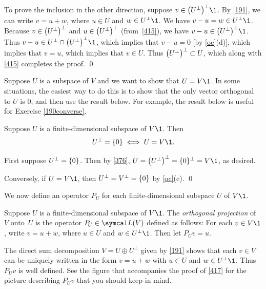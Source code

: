 To prove the inclusion in the other direction, suppose $v \in \paren[\big]{U^\perp}^\perp\1$.  By \ref{191}, we can write $v = u + w$, where
$u \in U$ and $w \in U^\perp\1$.  We have $v - u = w \in U^\perp\1$.  Because
$v \in \paren[\big]{U^\perp}^\perp$ and $u \in \paren[\big]{U^\perp}^\perp$
(from~\ref{415}), we have $v - u \in \paren[\big]{U^\perp}^\perp\1$.  Thus
$v - u \in  U^\perp \cap \paren[\big]{U^\perp}^\perp\1$,
which implies that $v - u = 0$ [by \ref{oc}(d)], which implies that $v = u$, which implies that
$v \in  U$.  Thus $\paren[\big]{U^\perp}^\perp \subset U$, which along with \ref{415}
completes the proof.
\qed

\pagebreak[3]


Suppose $U$ is a subspace of $V$ and we want to show that $U = V\1$. In some situations, the easiest way to do this is to show that the only vector orthogonal to $U$ is $0$, and then use the result below. For example, the result below is useful for Exercise \ref{190converse}.

{Suppose $U$ is a finite-dimensional subspace of $V\1$.  Then
\[
U^\perp = \{0\} \iff U = V\1.
\]}

\proof
First suppose $U^\perp = \br{0}$. Then by \ref{376}, $U = \paren[\big]{U^\perp}^\perp = \br{0}^\perp= V\1$, as desired.

Conversely, if $U = V\1$, then $U^\perp = V^\perp = \br{0}$ by \ref{oc}(c).
\qed

We now define an operator $P_{\!U}$ for each finite-dimensional subspace $U$ of $V\1$.

{
Suppose $U$ is a finite-dimensional subspace of $V\1$. The \emph{orthogonal \mbox{projection}} of~$V$ onto~$U$ is the operator $P_{\!U} \in \L(V)$ defined as follows: For each $v \in V\1$, write $v = u + w$, where $u \in U$ and $w \in U^\perp\1$. Then let $P_{\!U} v = u$.}

The direct sum decomposition $V = U \oplus U^\perp$ given by \ref{191} shows that each $v \in V$ can be uniquely written in the form
$v = u + w$ with $u \in U$ and $w \in U^\perp\1$. Thus $P_{\!U} v$ is well defined. See the figure that accompanies the proof of \ref{417} for the picture describing $P_{\!U} v$ that you should keep in mind.

